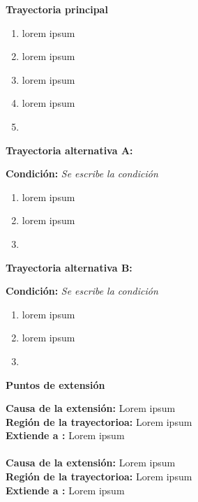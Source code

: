 \begin{large}
	\textbf{Trayectoria principal}
\end{large}	

\begin{enumerate}[1.]
	\item \actor lorem ipsum
	\item \sistema lorem ipsum
	\item \sistema lorem ipsum
	\item \sistema lorem ipsum
	\item \finCU	
\end{enumerate}



\begin{large}
	\textbf{Trayectoria alternativa A:}\\
\end{large}	
\textbf{Condición:} \textit{Se escribe la condición}
\begin{enumerate}[{A-}1.]

	\item \actor lorem ipsum
	\item \sistema lorem ipsum
	\item \finTA	

\end{enumerate}


\begin{large}
	\textbf{Trayectoria alternativa B:}\\
\end{large}	
\textbf{Condición:} \textit{Se escribe la condición}

\begin{enumerate}[{B-}1.]

	\item \actor lorem ipsum
	\item \sistema lorem ipsum
	\item \finTA	

\end{enumerate}



\begin{large}
	\textbf{Puntos de extensión}\\
\end{large}	

\textbf{Causa de la extensión:} Lorem ipsum\\
\textbf{Región de la trayectorioa:} Lorem ipsum\\
\textbf{Extiende a :} Lorem ipsum\\\\

\textbf{Causa de la extensión:} Lorem ipsum\\
\textbf{Región de la trayectorioa:} Lorem ipsum\\
\textbf{Extiende a :} Lorem ipsum\\

